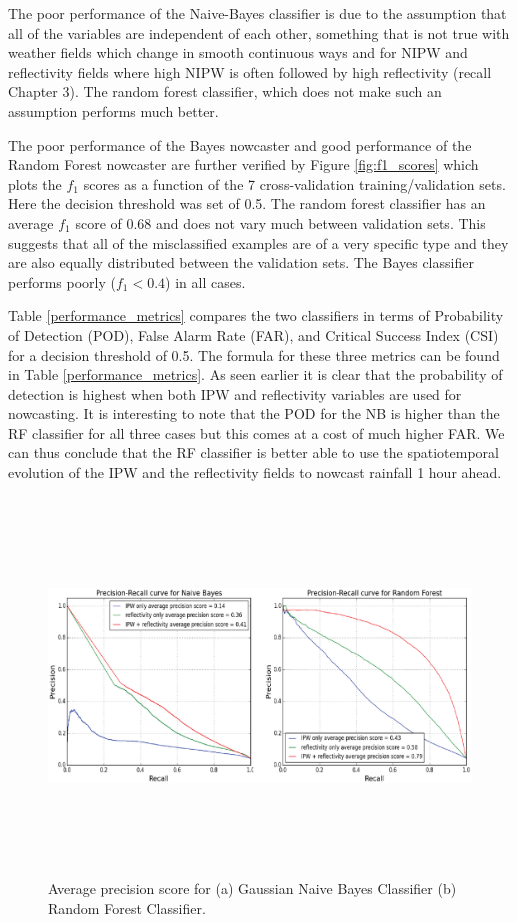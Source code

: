 \documentclass[proposal]{umassthesis}
\begin{document}
The poor performance of the Naive-Bayes classifier is due to the assumption that all of the variables are independent of each other, something that is not true with weather fields which change in smooth continuous ways and for NIPW and reflectivity fields where high NIPW is often followed by high reflectivity (recall Chapter 3). The random forest classifier, which does not make such an assumption performs much better.

The poor performance of the Bayes nowcaster and good performance of the Random Forest nowcaster are further verified by Figure \ref{fig:f1_scores} which plots the $f_1$ scores as a function of the 7 cross-validation training/validation sets. Here the decision threshold was set of 0.5. The random forest classifier has an average $f_1$ score of 0.68 and does not vary much between validation sets. This suggests that all of the misclassified examples are of a very specific type and they are also equally distributed between the validation sets. The Bayes classifier performs poorly ($f_1 < 0.4$) in all cases.

Table \ref{performance_metrics} compares the two classifiers in terms of Probability of Detection (POD), False Alarm Rate (FAR), and Critical Success Index (CSI) for a decision threshold of 0.5. The formula for these three metrics can be found in Table \ref{performance_metrics}. As seen earlier it is clear that the probability of detection is highest when both IPW and reflectivity variables are used for nowcasting. It is interesting to note that the POD for the NB is higher than the RF classifier for all three cases but this comes at a cost of much higher FAR. We can thus conclude that the RF classifier is better able to use the spatiotemporal evolution of the IPW and the reflectivity fields to nowcast rainfall 1 hour ahead. 

\begin{figure}[!t]
\begin{center}
\includegraphics[width = 15cm,height = 10cm]{PR_Curves.eps}
\caption{Average precision score for (a) Gaussian Naive Bayes Classifier (b) Random Forest Classifier.}\label{fig:PR_Curves}
\end{center}
\end{figure}
\end{document}
